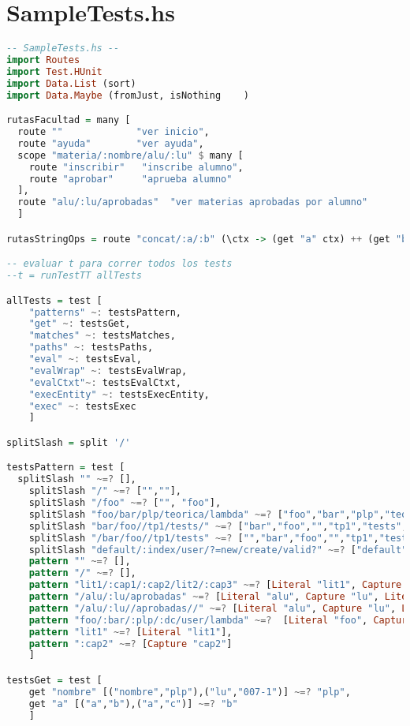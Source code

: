 \documentclass[10pt,a4paper]{article}
\begin{document}
 \section{SampleTests.hs}
\begin{lstlisting}[language=Haskell,breaklines=true,basicstyle=\tiny]
-- SampleTests.hs --
import Routes
import Test.HUnit
import Data.List (sort)
import Data.Maybe (fromJust, isNothing    )

rutasFacultad = many [
  route ""             "ver inicio",
  route "ayuda"        "ver ayuda",
  scope "materia/:nombre/alu/:lu" $ many [
    route "inscribir"   "inscribe alumno",
    route "aprobar"     "aprueba alumno"
  ],
  route "alu/:lu/aprobadas"  "ver materias aprobadas por alumno"
  ]

rutasStringOps = route "concat/:a/:b" (\ctx -> (get "a" ctx) ++ (get "b" ctx))

-- evaluar t para correr todos los tests
--t = runTestTT allTests

allTests = test [
    "patterns" ~: testsPattern,
    "get" ~: testsGet,
    "matches" ~: testsMatches,
    "paths" ~: testsPaths,
    "eval" ~: testsEval,
    "evalWrap" ~: testsEvalWrap,
    "evalCtxt"~: testsEvalCtxt,
    "execEntity" ~: testsExecEntity,
    "exec" ~: testsExec
    ]

splitSlash = split '/'

testsPattern = test [
  splitSlash "" ~=? [],
    splitSlash "/" ~=? ["",""],
    splitSlash "/foo" ~=? ["", "foo"],
    splitSlash "foo/bar/plp/teorica/lambda" ~=? ["foo","bar","plp","teorica","lambda"],
    splitSlash "bar/foo//tp1/tests/" ~=? ["bar","foo","","tp1","tests",""],
    splitSlash "/bar/foo//tp1/tests" ~=? ["","bar","foo","","tp1","tests"],
    splitSlash "default/:index/user/?=new/create/valid?" ~=? ["default",":index","user","?=new","create","valid?"],
    pattern "" ~=? [],
    pattern "/" ~=? [],
    pattern "lit1/:cap1/:cap2/lit2/:cap3" ~=? [Literal "lit1", Capture "cap1", Capture "cap2", Literal "lit2", Capture "cap3"],
    pattern "/alu/:lu/aprobadas" ~=? [Literal "alu", Capture "lu", Literal "aprobadas"],
    pattern "/alu/:lu//aprobadas//" ~=? [Literal "alu", Capture "lu", Literal "aprobadas"],
    pattern "foo/:bar/:plp/:dc/user/lambda" ~=?  [Literal "foo", Capture "bar", Capture "plp", Capture "dc", Literal "user", Literal "lambda"],
    pattern "lit1" ~=? [Literal "lit1"],
    pattern ":cap2" ~=? [Capture "cap2"]
    ]

testsGet = test [
    get "nombre" [("nombre","plp"),("lu","007-1")] ~=? "plp",
    get "a" [("a","b"),("a","c")] ~=? "b"
    ]


\end{lstlisting}
\end{document}
